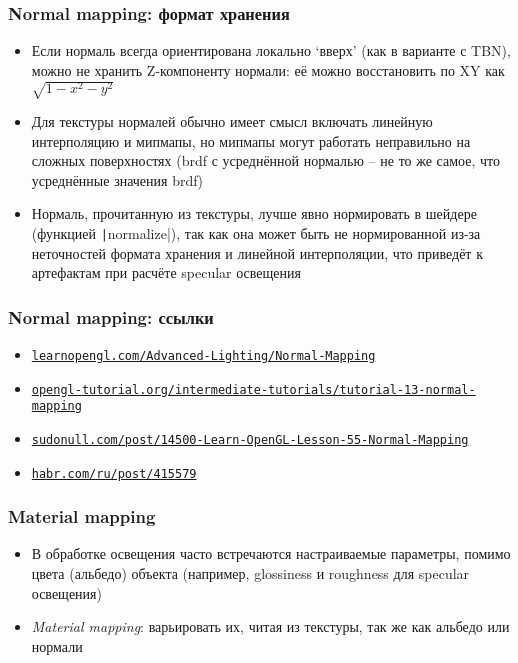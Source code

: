 \documentclass[10pt]{beamer}
\begin{document}
\begin{frame}[fragile]
\frametitle{Normal mapping: формат хранения}
\fontsize{10pt}{10pt}
\begin{itemize}
\item Если нормаль всегда ориентирована локально `вверх' (как в варианте с TBN), можно не хранить Z-компоненту нормали: её можно восстановить по XY как \begin{math}\sqrt{1-x^2-y^2}\end{math}
\pause
\item Для текстуры нормалей обычно имеет смысл включать линейную интерполяцию и мипмапы, но мипмапы могут работать неправильно на сложных поверхностях (brdf с усреднённой нормалью -- не то же самое, что усреднённые значения brdf)
\pause
\item Нормаль, прочитанную из текстуры, лучше явно нормировать в шейдере (функцией \texttt|normalize|), так как она может быть не нормированной из-за неточностей формата хранения и линейной интерполяции, что приведёт к артефактам при расчёте specular освещения
\end{itemize}
\end{frame}

\begin{frame}[fragile]
\frametitle{Normal mapping: ссылки}
\begin{itemize}
\item \href{https://learnopengl.com/Advanced-Lighting/Normal-Mapping}{\texttt{learnopengl.com/Advanced-Lighting/Normal-Mapping}}
\item \href{http://www.opengl-tutorial.org/intermediate-tutorials/tutorial-13-normal-mapping}{\texttt{opengl-tutorial.org/intermediate-tutorials/tutorial-13-normal-mapping}}
\item \href{https://sudonull.com/post/14500-Learn-OpenGL-Lesson-55-Normal-Mapping}{\texttt{sudonull.com/post/14500-Learn-OpenGL-Lesson-55-Normal-Mapping}}
\item \href{https://habr.com/ru/post/415579}{\texttt{habr.com/ru/post/415579}}
\end{itemize}
\end{frame}

\begin{frame}[fragile]
\frametitle{Material mapping}
\begin{itemize}
\item В обработке освещения часто встречаются настраиваемые параметры, помимо цвета (альбедо) объекта (например, glossiness и roughness для specular освещения)
\pause
\item \textit{Material mapping}: варьировать их, читая из текстуры, так же как альбедо или нормали
\end{itemize}
\end{frame}
\end{document}
